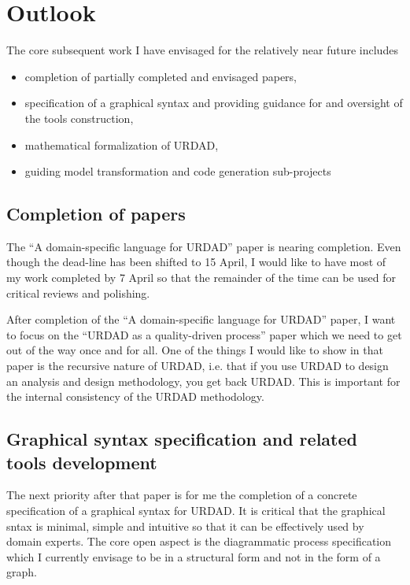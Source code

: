\section{Outlook}

The core subsequent work I have envisaged for the relatively near future includes
\begin{itemize}
 \item completion of partially completed and envisaged papers,
 \item specification of a graphical syntax and providing guidance for and oversight of the tools construction,
 \item mathematical formalization of URDAD,
 \item guiding model transformation and code generation sub-projects
\end{itemize}

\subsection{Completion of papers}

The ``A domain-specific language for URDAD'' paper is nearing completion. Even though the dead-line has been shifted to 15 April, I would like to have most of my work completed by 7 April so that the remainder of the time can be used for critical reviews and polishing.

After completion of the ``A domain-specific language for URDAD'' paper, I want to focus on the ``URDAD as a quality-driven process'' paper which we need to get out of the way once and for all. One of the things I would like to show in that paper is the recursive nature of URDAD, i.e. that if you use URDAD to design an analysis and design methodology, you get back URDAD. This is important for the internal consistency of the URDAD methodology.

\subsection{Graphical syntax specification and related tools development}
The next priority after that paper is for me the completion of a concrete specification of a graphical syntax for URDAD. It is critical that the graphical sntax is minimal, simple and intuitive so that it can be effectively used by domain experts. The core open aspect is the diagrammatic process specification which I currently envisage to be in a structural form and not in the form of a graph.

